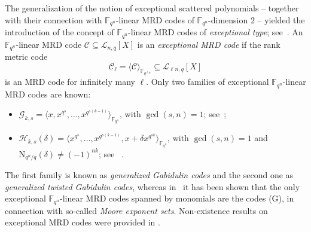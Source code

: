 \documentclass[11pt]{article}
\theoremstyle{definition}
\numberwithin{equation}{section}
\begin{document}
The generalization of the notion of exceptional scattered polynomials -- together with  their connection with $\mathbb{F}_{q^n}$-linear MRD codes of ${\mathbb F}_{q^n}$-dimension $2$ -- yielded the introduction of the concept of 
 $\mathbb{F}_{q^n}$-linear MRD codes of \emph{exceptional type}; see~\cite{bartoli2021linear}.
An $\mathbb{F}_{q^n}$-linear MRD code $\mathcal{C}\subseteq\mathcal{L}_{n,q}[X]$ is an \emph{exceptional MRD code} if the rank metric code
\[ \mathcal{C}_\ell=\langle\mathcal{C}\rangle_{\mathbb{F}_{q^{\ell n}}}\subseteq \mathcal{L}_{\ell n,q}[X] \]
is an MRD code for infinitely many $\ell$.
Only two families of exceptional $\mathbb{F}_{q^n}$-linear MRD codes are known:
\begin{itemize}
    \item[(G)] $\mathcal{G}_{k,s}=\langle x,x^{q^s},\ldots,x^{q^{s(k-1)}}\rangle_{\mathbb{F}_{q^n}}$, with $\gcd(s,n)=1$; see~\cite{delsarte1978bilinear,gabidulin1985theory,kshevetskiy2005new};
    \item[(T)] $\mathcal{H}_{k,s}(\delta)=\langle x^{q^s},\ldots,x^{q^{s(k-1)}},x+\delta x^{q^{sk}}\rangle_{\mathbb{F}_{q^n}}$, with $\gcd(s,n)=1$ and $\mathrm{N}_{q^n/q}(\delta)\neq (-1)^{nk}$; see ~\cite{sheekey2016new,lunardon2018generalized}. 
\end{itemize}
The first family is known as \emph{generalized Gabidulin codes} and the second one as \emph{generalized twisted Gabidulin codes}, whereas in~\cite{bartoli2018exceptional} it has been shown that the only exceptional $\mathbb{F}_{q^n}$-linear MRD codes spanned by monomials are the codes (G), in connection with so-called \emph{Moore exponent sets}. Non-existence results on exceptional MRD codes were provided in \cite[Main Theorem]{bartoli2021linear}.
\end{document}
